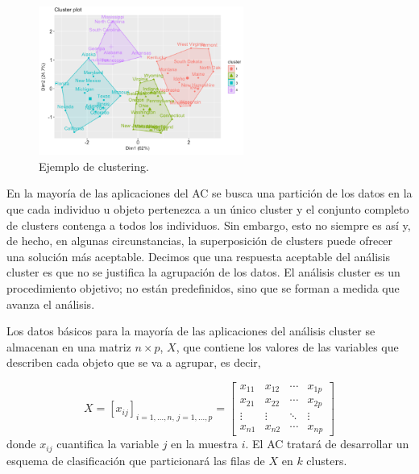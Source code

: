 \begin{figure}[h]
    \centering
    \includegraphics[width=0.6\textwidth]{../img/cluster-1.png}
    \caption{Ejemplo de clustering\cite{img-cluster-1}.}
\end{figure}

En la mayoría de las aplicaciones del AC se busca una partición de los datos en la que cada individuo u objeto pertenezca a un único cluster y el conjunto completo de clusters
contenga a todos los individuos. Sin embargo, esto no siempre es así y, de hecho, en algunas circunstancias, la superposición de clusters puede ofrecer una solución más aceptable.
Decimos que una respuesta aceptable del análisis cluster es que no se justifica la agrupación de los datos. El análisis cluster es un procedimiento objetivo; no están predefinidos,
sino que se forman a medida que avanza el análisis. \newline

Los datos básicos para la mayoría de las aplicaciones del análisis cluster se almacenan en una matriz $n \times p$, $X$, que contiene los valores de las variables que describen
cada objeto que se va a agrupar, es decir,

\[
X = [x_{ij}]_{i=1,\dots,n,\, j=1,\dots,p} =
\begin{bmatrix}
x_{11} & x_{12} & \cdots & x_{1p} \\
x_{21} & x_{22} & \cdots & x_{2p} \\
\vdots & \vdots & \ddots & \vdots \\
x_{n1} & x_{n2} & \cdots & x_{np}
\end{bmatrix}
\]
donde $x_{ij}$ cuantifica la variable $j$ en la muestra $i$. El AC tratará de desarrollar un esquema de clasificación que particionará las filas de $X$ en $k$ clusters\cite{clustering-2}. %


